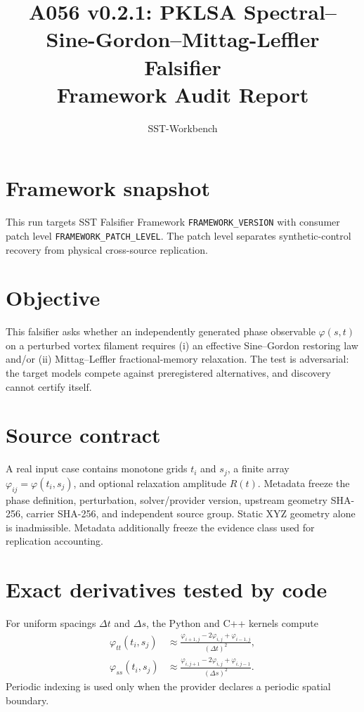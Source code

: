 \documentclass[11pt]{article}
\title{A056 v0.2.1: PKLSA Spectral--Sine-Gordon--Mittag-Leffler Falsifier\\Framework Audit Report}
\author{SST-Workbench}
\date{}
\begin{document}
\maketitle

\section{Framework snapshot}
This run targets SST Falsifier Framework \texttt{{{FRAMEWORK_VERSION}}} with consumer patch level \texttt{{{FRAMEWORK_PATCH_LEVEL}}}. The patch level separates synthetic-control recovery from physical cross-source replication.

\section{Objective}
This falsifier asks whether an independently generated phase observable $\varphi(s,t)$ on a perturbed vortex filament requires (i) an effective Sine--Gordon restoring law and/or (ii) Mittag--Leffler fractional-memory relaxation.  The test is adversarial: the target models compete against preregistered alternatives, and discovery cannot certify itself.

\section{Source contract}
A real input case contains monotone grids $t_i$ and $s_j$, a finite array $\varphi_{ij}=\varphi(t_i,s_j)$, and optional relaxation amplitude $R(t)$.  Metadata freeze the phase definition, perturbation, solver/provider version, upstream geometry SHA-256, carrier SHA-256, and independent source group.  Static XYZ geometry alone is inadmissible. Metadata additionally freeze the evidence class used for replication accounting.

\section{Exact derivatives tested by code}
For uniform spacings $\Delta t$ and $\Delta s$, the Python and C++ kernels compute
\begin{align}
\varphi_{tt}(t_i,s_j)&\approx\frac{\varphi_{i+1,j}-2\varphi_{i,j}+\varphi_{i-1,j}}{(\Delta t)^2},\\
\varphi_{ss}(t_i,s_j)&\approx\frac{\varphi_{i,j+1}-2\varphi_{i,j}+\varphi_{i,j-1}}{(\Delta s)^2}.
\end{align}
Periodic indexing is used only when the provider declares a periodic spatial boundary.
\end{document}
